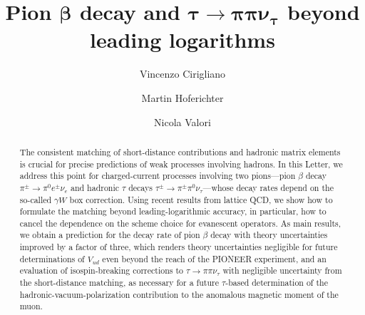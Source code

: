 \documentclass[prl,twocolumn,twoside,preprintnumbers,superscriptaddress,nofootinbib,letterpaper]{revtex4-1}
\begin{document}
\title{Pion \texorpdfstring{$\boldsymbol{\beta}$}{} decay and \texorpdfstring{$\boldsymbol{\tau\to\pi\pi\nu_\tau}$}{} beyond leading logarithms}

\author{Vincenzo Cirigliano}
\author{Martin Hoferichter}
\author{Nicola Valori}


\begin{abstract}
   The consistent matching of short-distance contributions and hadronic matrix elements is crucial for precise predictions of weak processes involving hadrons. In this Letter, we address this point for charged-current processes involving two pions---pion $\beta$ decay $\pi^\pm\to\pi^0 e^\pm\nu_e$ and hadronic $\tau$ decays $\tau^\pm\to\pi^\pm\pi^0\nu_\tau$---whose decay rates depend on the so-called $\gamma W$ box correction. Using recent results from lattice QCD, we show how to formulate the matching beyond leading-logarithmic accuracy, in particular, how to cancel the dependence on the scheme choice for evanescent operators. As main results, we
  obtain a prediction for the decay rate of pion $\beta$ decay with theory uncertainties improved by a factor of three, which renders theory uncertainties negligible for future determinations of $V_{ud}$ even beyond the reach of the PIONEER experiment, and
  an evaluation of isospin-breaking corrections to $\tau\to\pi\pi\nu_\tau$ with negligible uncertainty from the short-distance matching, as necessary for a future $\tau$-based determination of the hadronic-vacuum-polarization contribution to the anomalous magnetic moment of the muon.
\end{abstract}

\maketitle
\end{document}
